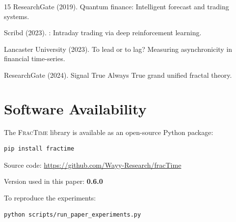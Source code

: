 \documentclass[12pt,a4paper]{article}
\begin{document}
\begin{thebibliography}{15}
ResearchGate (2019).
\newblock Quantum finance: Intelligent forecast and trading systems.

Scribd (2023).
: Intraday trading via deep reinforcement learning.

Lancaster University (2023).
\newblock To lead or to lag? {M}easuring asynchronicity in financial
  time-series.

ResearchGate (2024).
\newblock Signal {T}rue {A}lways {T}rue grand unified fractal theory.

\end{thebibliography}

\appendix

\section{Software Availability}
\label{app:software}

The \textsc{FracTime} library is available as an open-source Python package:

\begin{verbatim}
pip install fractime
\end{verbatim}

\noindent Source code: \url{https://github.com/Wayy-Research/fracTime}

\noindent Version used in this paper: \textbf{0.6.0}

\noindent To reproduce the experiments:
\begin{verbatim}
python scripts/run_paper_experiments.py
\end{verbatim}
\end{document}
